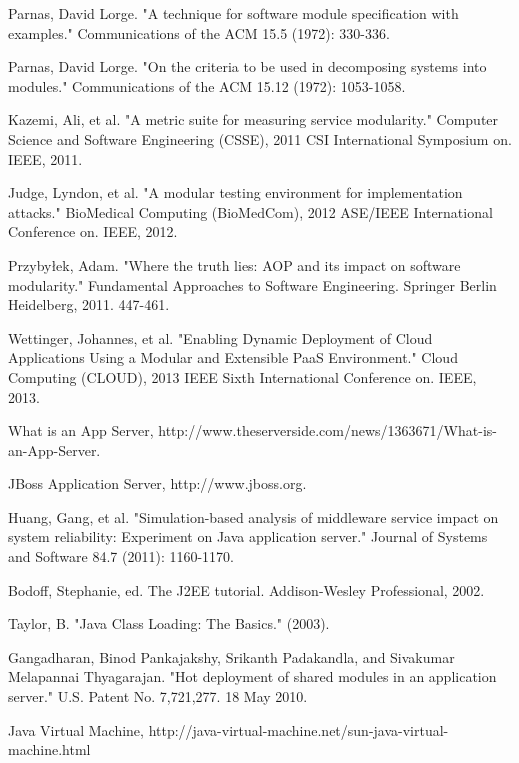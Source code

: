 \documentclass[conference]{IEEEtran}
\begin{document}
\begin{thebibliography}{9}

Parnas, David Lorge. "A technique for software module specification with examples." Communications of the ACM 15.5 (1972): 330-336.

Parnas, David Lorge. "On the criteria to be used in decomposing systems into modules." Communications of the ACM 15.12 (1972): 1053-1058.

Kazemi, Ali, et al. "A metric suite for measuring service modularity." Computer Science and Software Engineering (CSSE), 2011 CSI International Symposium on. IEEE, 2011.

Judge, Lyndon, et al. "A modular testing environment for implementation attacks." BioMedical Computing (BioMedCom), 2012 ASE/IEEE International Conference on. IEEE, 2012.

Przybyłek, Adam. "Where the truth lies: AOP and its impact on software modularity." Fundamental Approaches to Software Engineering. Springer Berlin Heidelberg, 2011. 447-461.

Wettinger, Johannes, et al. "Enabling Dynamic Deployment of Cloud Applications Using a Modular and Extensible PaaS Environment." Cloud Computing (CLOUD), 2013 IEEE Sixth International Conference on. IEEE, 2013.

What is an App Server, http://www.theserverside.com/news/1363671/What-is-an-App-Server.

JBoss Application Server, http://www.jboss.org.

Huang, Gang, et al. "Simulation-based analysis of middleware service impact on system reliability: Experiment on Java application server." Journal of Systems and Software 84.7 (2011): 1160-1170.

Bodoff, Stephanie, ed. The J2EE tutorial. Addison-Wesley Professional, 2002.

Taylor, B. "Java Class Loading: The Basics." (2003).

Gangadharan, Binod Pankajakshy, Srikanth Padakandla, and Sivakumar Melapannai Thyagarajan. "Hot deployment of shared modules in an application server." U.S. Patent No. 7,721,277. 18 May 2010.

Java Virtual Machine, http://java-virtual-machine.net/sun-java-virtual-machine.html


\end{thebibliography}
\end{document}

